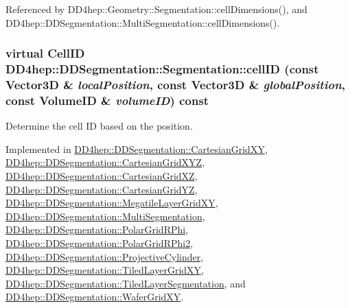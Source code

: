 Referenced by DD4hep::Geometry::Segmentation::cellDimensions(), and DD4hep::DDSegmentation::MultiSegmentation::cellDimensions().\hypertarget{class_d_d4hep_1_1_d_d_segmentation_1_1_segmentation_ad5a60953d96d409850d8192f64f8ce3c}{
\subsubsection[{cellID}]{\setlength{\rightskip}{0pt plus 5cm}virtual {\bf CellID} DD4hep::DDSegmentation::Segmentation::cellID (const {\bf Vector3D} \& {\em localPosition}, \/  const {\bf Vector3D} \& {\em globalPosition}, \/  const {\bf VolumeID} \& {\em volumeID}) const}}
\label{class_d_d4hep_1_1_d_d_segmentation_1_1_segmentation_ad5a60953d96d409850d8192f64f8ce3c}


Determine the cell ID based on the position. 

Implemented in \hyperlink{class_d_d4hep_1_1_d_d_segmentation_1_1_cartesian_grid_x_y_ac7de84f02aa18034f60f6319982ac4e3}{DD4hep::DDSegmentation::CartesianGridXY}, \hyperlink{class_d_d4hep_1_1_d_d_segmentation_1_1_cartesian_grid_x_y_z_a50e24896d0efee32af5349b3c69d4866}{DD4hep::DDSegmentation::CartesianGridXYZ}, \hyperlink{class_d_d4hep_1_1_d_d_segmentation_1_1_cartesian_grid_x_z_a6db94d0b7df8a5ad6bb3a708281ddd4e}{DD4hep::DDSegmentation::CartesianGridXZ}, \hyperlink{class_d_d4hep_1_1_d_d_segmentation_1_1_cartesian_grid_y_z_a96102e475a228e43a48f75fe2e98f191}{DD4hep::DDSegmentation::CartesianGridYZ}, \hyperlink{class_d_d4hep_1_1_d_d_segmentation_1_1_megatile_layer_grid_x_y_abb23df6fd5f38a8324dd3711f0e452bf}{DD4hep::DDSegmentation::MegatileLayerGridXY}, \hyperlink{class_d_d4hep_1_1_d_d_segmentation_1_1_multi_segmentation_aefbdc896e43100b7781e07dafc9a9fec}{DD4hep::DDSegmentation::MultiSegmentation}, \hyperlink{class_d_d4hep_1_1_d_d_segmentation_1_1_polar_grid_r_phi_adb32acd7b9fda25d500d4f89c5ac0e6c}{DD4hep::DDSegmentation::PolarGridRPhi}, \hyperlink{class_d_d4hep_1_1_d_d_segmentation_1_1_polar_grid_r_phi2_ae1cd15b95add489ababb51f9103de6b4}{DD4hep::DDSegmentation::PolarGridRPhi2}, \hyperlink{class_d_d4hep_1_1_d_d_segmentation_1_1_projective_cylinder_a5aaa84e94618e058c743cf5bd44db446}{DD4hep::DDSegmentation::ProjectiveCylinder}, \hyperlink{class_d_d4hep_1_1_d_d_segmentation_1_1_tiled_layer_grid_x_y_a7b37dc7981a6f36fdc67bd2759af7bdb}{DD4hep::DDSegmentation::TiledLayerGridXY}, \hyperlink{class_d_d4hep_1_1_d_d_segmentation_1_1_tiled_layer_segmentation_a481dd2415b1b931234efbca27617f1dd}{DD4hep::DDSegmentation::TiledLayerSegmentation}, and \hyperlink{class_d_d4hep_1_1_d_d_segmentation_1_1_wafer_grid_x_y_a9212a3077b9a25425612aa52d121bac9}{DD4hep::DDSegmentation::WaferGridXY}.


